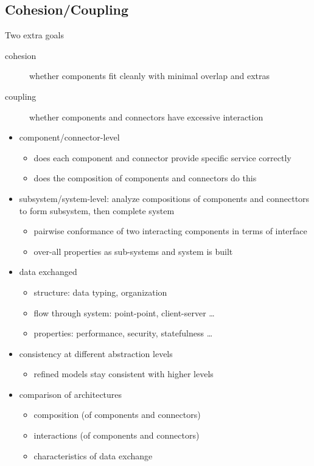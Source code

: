 \documentclass[]{article}
\theoremstyle{definition}
\begin{document}
	\subsection{Cohesion/Coupling}
	Two extra goals
	\begin{description}
		\item[cohesion] whether components fit cleanly with minimal overlap and extras
		\item[coupling] whether components and connectors have excessive interaction
	\end{description}
	\begin{itemize}
		\item component/connector-level
			\begin{itemize}
				\item does each component and connector provide specific service correctly
				\item does the composition of components and connectors do this
			\end{itemize}
		\item subsystem/system-level: analyze compositions of components and connecttors to form subsystem, then complete system
			\begin{itemize}
				\item pairwise conformance of two interacting components in terms of interface
				\item over-all properties as sub-systems and system is built
			\end{itemize}
		\item data exchanged
			\begin{itemize}
				\item structure: data typing, organization
				\item flow through system: point-point, client-server \dots
				\item properties: performance, security, statefulness \dots
			\end{itemize}
		\item consistency at different abstraction levels
			\begin{itemize}
				\item refined models stay consistent with higher levels
			\end{itemize}
		\item comparison of architectures
			\begin{itemize}
				\item composition (of components and connectors)
				\item interactions (of components and connectors)
				\item characteristics of data exchange
			\end{itemize}
	\end{itemize}
\end{document}

